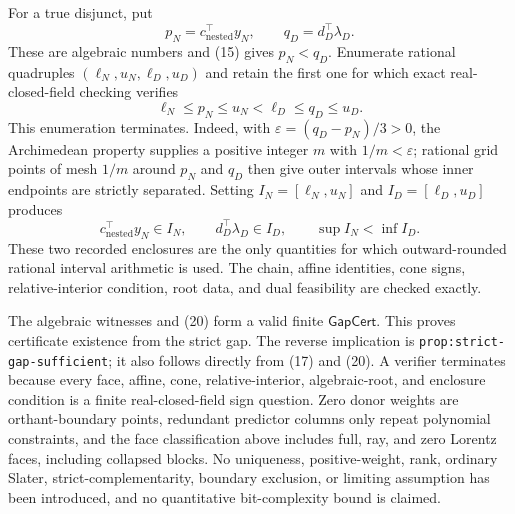 For a true disjunct, put
\[
 p_N=c_{\mathrm{nested}}^{\top}y_N,
 \qquad q_D=d_D^{\top}\lambda_D.
\]
These are algebraic numbers and (15) gives \(p_N<q_D\).  Enumerate rational quadruples \((\ell_N,u_N,\ell_D,u_D)\) and retain the first one for which exact real-closed-field checking verifies
\[
 \ell_N\leq p_N\leq u_N<\ell_D\leq q_D\leq u_D.                       \tag{19}
\]
This enumeration terminates.  Indeed, with \(\varepsilon=(q_D-p_N)/3>0\), the Archimedean property supplies a positive integer \(m\) with \(1/m<\varepsilon\); rational grid points of mesh \(1/m\) around \(p_N\) and \(q_D\) then give outer intervals whose inner endpoints are strictly separated.  Setting \(I_N=[\ell_N,u_N]\) and \(I_D=[\ell_D,u_D]\) produces
\[
 c_{\mathrm{nested}}^{\top}y_N\in I_N,
 \qquad d_D^{\top}\lambda_D\in I_D,
 \qquad \sup I_N<\inf I_D.                                             \tag{20}
\]
These two recorded enclosures are the only quantities for which outward-rounded rational interval arithmetic is used.  The chain, affine identities, cone signs, relative-interior condition, root data, and dual feasibility are checked exactly.

The algebraic witnesses and (20) form a valid finite \(\mathsf{GapCert}\).  This proves certificate existence from the strict gap.  The reverse implication is \texttt{prop:strict-gap-sufficient}; it also follows directly from (17) and (20).  A verifier terminates because every face, affine, cone, relative-interior, algebraic-root, and enclosure condition is a finite real-closed-field sign question.  Zero donor weights are orthant-boundary points, redundant predictor columns only repeat polynomial constraints, and the face classification above includes full, ray, and zero Lorentz faces, including collapsed blocks.  No uniqueness, positive-weight, rank, ordinary Slater, strict-complementarity, boundary exclusion, or limiting assumption has been introduced, and no quantitative bit-complexity bound is claimed.
